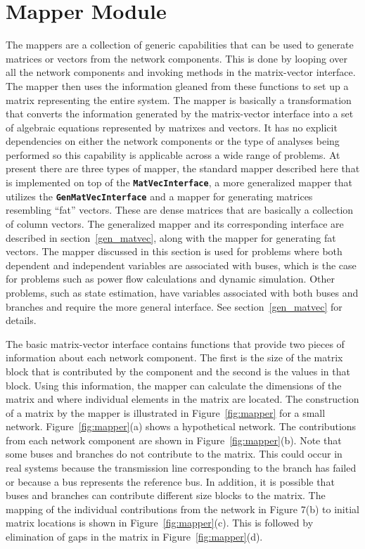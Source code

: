 \section{Mapper Module}\label{mapper}

The mappers are a collection of generic capabilities that can be used to
generate matrices or vectors from the network components. This is done by
looping over all the network components and invoking methods in the
matrix-vector interface. The mapper then uses the information gleaned from these
functions to set up a matrix representing the entire system.
The mapper is basically a transformation that converts
the information generated by the matrix-vector interface into a set of algebraic
equations represented by matrixes and vectors.
It has no explicit dependencies on either the
network components or the type of analyses being performed so this capability is
applicable across a wide range of problems. At present there are three types of
mapper, the standard mapper described here that is implemented on top of the
\texttt{\textbf{MatVecInterface}}, a more generalized mapper that utilizes the
\texttt{\textbf{GenMatVecInterface}} and a mapper for generating matrices
resembling ``fat'' vectors. These are dense matrices that are basically a
collection of column vectors. The generalized mapper and its corresponding
interface are described in section~\ref{gen_matvec}, along with the mapper for
generating fat vectors. The mapper discussed in this section is used for
problems where both dependent and independent variables are associated with
buses, which is the case for problems such as power flow calculations and
dynamic simulation. Other problems, such as state estimation, have variables
associated with both buses and branches and require the more general interface.
See section~\ref{gen_matvec} for details.

The basic matrix-vector interface contains functions that provide two pieces of
information about each network component. The first is the size of the matrix
block that is contributed by the component and the second is the values in that
block. Using this information, the mapper can calculate the dimensions of the
matrix and where individual elements in the matrix are located. The construction
of a matrix by the mapper is illustrated in  Figure~\ref{fig:mapper} for a small
network. Figure~\ref{fig:mapper}(a) shows a hypothetical network. The
contributions from each network component are shown in
Figure~\ref{fig:mapper}(b). Note that some buses and branches do not contribute
to the matrix. This could occur in real systems because the transmission line
corresponding to the branch has failed or because a bus represents the reference
bus. In addition, it is possible that buses and branches can contribute
different size blocks to the matrix. The mapping of the individual contributions
from the network in Figure 7(b) to initial matrix locations is shown in
Figure~\ref{fig:mapper}(c). This is followed by elimination of gaps in the
matrix in Figure~\ref{fig:mapper}(d).

